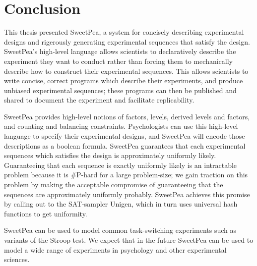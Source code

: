 \chapter{Conclusion}

This thesis presented SweetPea, a system for concisely describing experimental designs and rigerously generating experimental sequences that satisfy the design. SweetPea's high-level language allows scientists to declaratively describe the experiment they want to conduct rather than forcing them to mechanically describe how to construct their experimental sequences. This allows scientists to write concise, correct programs which describe their experiments, and produce unbiased experimental sequences; these programs can then be published and shared to document the experiment and facilitate replicability.

SweetPea provides high-level notions of factors, levels, derived levels and factors, and counting and balancing constraints. Psychologists can use this high-level language to specify their experimental designs, and SweetPea will encode those descriptions as a boolean formula. SweetPea guarantees that each experimental sequences which satisfies the design is approximately uniformly likely. Guaranteeing that each sequence is exactly uniformly likely is an intractable problem because it is \#P-hard for a large problem-size; we gain traction on this problem by making the acceptable compromise of guaranteeing that the sequences are approximately uniformly probably. SweetPea achieves this promise by calling out to the SAT-sampler Unigen, which in turn uses universal hash functions to get uniformity.

SweetPea can be used to model common task-switching experiments such as variants of the Stroop test. We expect that in the future SweetPea can be used to model a wide range of experiments in psychology and other experimental sciences.
